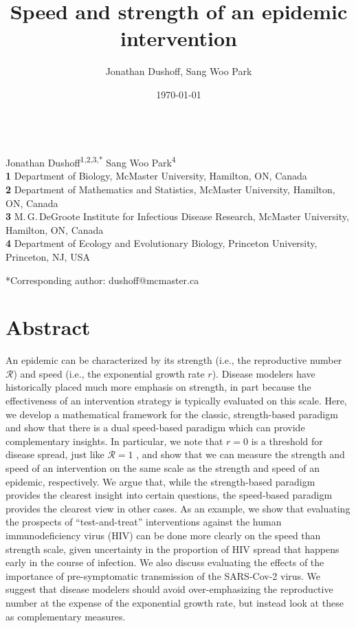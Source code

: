 \documentclass[12pt]{article}
\title{Speed and strength of an epidemic intervention}
\author{Jonathan Dushoff, Sang Woo Park}
\date{\today}
\newcommand{\RR}{\ensuremath{{\mathcal R}}}
\begin{document}
\begin{flushleft}{
	\Large
	\textbf{}
}
\newline
\\
Jonathan Dushoff\textsuperscript{1,2,3,*}
Sang Woo Park\textsuperscript{4}
\\
\bigskip
\textbf{1} Department of Biology, McMaster University, Hamilton, ON, Canada
\\
\textbf{2} Department of Mathematics and Statistics, McMaster University, Hamilton, ON, Canada
\\
\textbf{3} M.\,G.\,DeGroote Institute for Infectious Disease Research, McMaster University, Hamilton, ON, Canada
\\
\textbf{4} Department of Ecology and Evolutionary Biology, Princeton University, Princeton, NJ, USA
\\
\bigskip

*Corresponding author: dushoff@mcmaster.ca
\end{flushleft}

\section*{Abstract}

An epidemic can be characterized by its strength (i.e., the reproductive number \RR) and speed (i.e., the exponential growth rate $r$).
Disease modelers have historically placed much more emphasis on strength, in part because the effectiveness of an intervention strategy is typically evaluated on this scale.  
Here, we develop a mathematical framework for the classic, strength-based paradigm and show that there is a dual speed-based paradigm which can provide complementary insights.
In particular, we note that $r=0$ is a threshold for disease spread, just like $\RR=1$ \cite{dhmKermack}, and show that we can measure the strength and speed of an intervention on the same scale as the strength and speed of an epidemic, respectively.
We argue that, while the strength-based paradigm provides the clearest insight into certain questions, the speed-based paradigm provides the clearest view in other cases.
As an example, we show that evaluating the prospects of ``test-and-treat'' interventions against the human immunodeficiency virus (HIV) can be done more clearly on the speed than strength scale, given uncertainty in the proportion of HIV spread that happens early in the course of infection. 
We also discuss evaluating the effects of the importance of pre-symptomatic transmission of the SARS-Cov-2 virus.
We suggest that disease modelers should avoid over-emphasizing the reproductive number at the expense of the exponential growth rate, but instead look at these as complementary measures.
\end{document}
